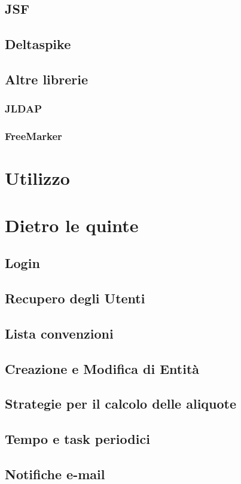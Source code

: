 \documentclass[italian,laurea,twoside,10pt]{UFtesi}
\begin{document}
\section{JSF}
\label{jsf}

\section{Deltaspike}
\label{delta}

\section{Altre librerie}
\label{libs}
\subsection{JLDAP}
\label{jldap}

\subsection{FreeMarker}
\label{freemarker}

\chapter{Utilizzo}

\label{howto}
\chapter{Dietro le quinte}
\label{code}
\section{Login}
\label{login}

\section{Recupero degli Utenti}

\section{Lista convenzioni}


\section{Creazione e Modifica di Entità}


\section{Strategie per il calcolo delle aliquote}

\section{Tempo e task periodici}

\section{Notifiche e-mail}

\end{document}
